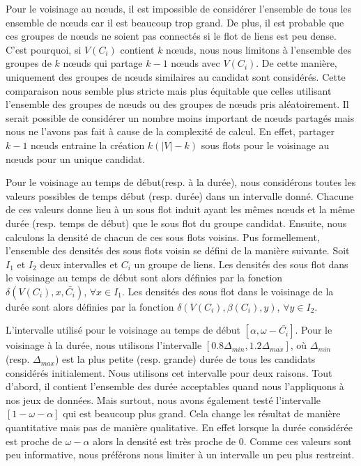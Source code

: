 Pour le voisinage au n\oe uds, il est impossible de considérer l'ensemble de tous les ensemble de n\oe uds car il est beaucoup trop grand.
De plus, il est probable que ces groupes de n\oe uds ne soient pas connectés si le flot de liens est peu dense.
C'est pourquoi, si $V(C_i)$ contient $k$ n\oe uds, nous nous limitons à l'ensemble des groupes de $k$ n\oe uds qui partage $k-1$ n\oe uds avec $V(C_i)$.
De cette manière, uniquement des groupes de n\oe uds similaires au candidat sont considérés.
Cette comparaison nous semble plus stricte mais plus équitable que celles utilisant l'ensemble des groupes de n\oe uds ou des groupes de n\oe uds pris aléatoirement.
Il serait possible de considérer un nombre moins important de n\oe uds partagés mais nous ne l'avons pas fait à cause de la complexité de calcul.
En effet, partager $k-1$ n\oe uds entraine la création $k(|V|-k)$ sous flots pour le voisinage au n\oe uds pour un unique candidat.

Pour le voisinage au temps de début(resp. à la durée), nous considérons toutes les valeurs possibles de temps début (resp. durée) dans un intervalle donné.
Chacune de ces valeurs donne lieu à un sous flot induit ayant les mêmes n\oe uds et la même durée (resp. temps de début) que le sous flot du groupe candidat.
Ensuite, nous calculons la densité de chacun de ces sous flots voisins.
Pus formellement, l'ensemble des densités des sous flots voisin se défini de la manière suivante.
Soit $I_1$ et $I_2$ deux intervalles et $C_i$ un groupe de liens.
Les densités des sous flot dans le voisinage au temps de début sont alors définies par la fonction $\delta(V(C_i),x, \bar{C_i})$, $\forall x \in I_1$.
Les densités des sous flot dans le voisinage de la durée sont alors définies par la fonction $\delta(V(C_i),\beta(C_i), y)$, $\forall y \in I_2$.

L'intervalle utilisé pour le voisinage au temps de début $[\alpha, \omega-\bar{C_i}]$.
Pour le voisinage à la durée, nous utilisons l'intervalle $[0.8\Delta_{min}, 1.2\Delta_{max}]$, où $\Delta_{min}$ (resp. $\Delta_{max}$) est la plus petite (resp. grande) durée de tous les candidats considérés initialement.
Nous utilisons cet intervalle pour deux raisons.
Tout d'abord, il contient l'ensemble des durée acceptables quand nous l'appliquons à nos jeux de données.
Mais surtout, nous avons également testé l'intervalle $[1-\omega-\alpha]$ qui est beaucoup plus grand.
Cela change les résultat de manière quantitative mais pas de manière qualitative.
En effet lorsque la durée considérée est proche de $\omega-\alpha$ alors la densité est très proche de $0$.
Comme ces valeurs sont peu informative, nous préférons nous limiter à un intervalle un peu plus restreint.
\bigskip

